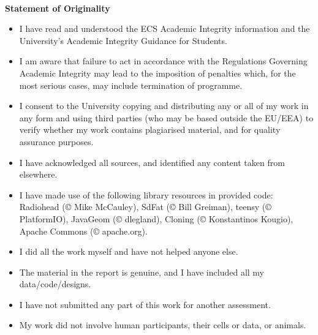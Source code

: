 \thispagestyle{plain}
\null\vfill\
\begin{center}
{\Large\bf Statement of Originality \par}
\end{center}
\begin{itemize}
	\item I have read and understood the ECS Academic Integrity information and the University’s Academic Integrity Guidance for Students.
	\item I am aware that failure to act in accordance with the Regulations Governing Academic Integrity may lead to the imposition of penalties which, for the most serious cases, may include termination of programme.
	\item I consent to the University copying and distributing any or all of my work in any form and using third parties (who may be based outside the EU/EEA) to verify whether my work contains plagiarised material, and for quality assurance purposes.
\item I have acknowledged all sources, and identified any content taken from elsewhere.
\item I have made use of the following library resources in provided code: \\
Radiohead (\copyright\xspace Mike McCauley), SdFat (\copyright\xspace Bill Greiman), teensy (\copyright\xspace PlatformIO), JavaGeom (\copyright\xspace dlegland),  Cloning (\copyright\xspace Konstantinos Kougio), Apache Commons (\copyright\xspace apache.org).
\item I did all the work myself and have not helped anyone else.
\item The material in the report is genuine, and I have included all my data/code/designs. 
\item I have not submitted any part of this work for another assessment.
\item My work did not involve human participants, their cells or data, or animals.
\end{itemize}
\vspace{5cm}
\vfill
\cleardoublepage